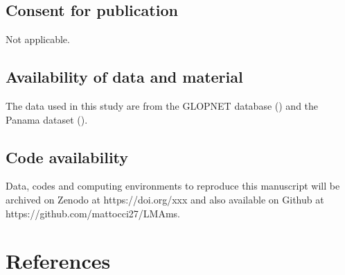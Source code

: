 \documentclass[
  12pt,
  letterpaper,
  DIV=11,
  numbers=noendperiod]{scrartcl}
\begin{document}
\subsection{Consent for publication}\label{consent-for-publication}

Not applicable.

\subsection{Availability of data and
material}\label{availability-of-data-and-material}

The data used in this study are from the GLOPNET database
() and the Panama dataset
().

\subsection{Code availability}\label{code-availability}

Data, codes and computing environments to reproduce this manuscript will
be archived on Zenodo at https://doi.org/xxx and also available on
Github at https://github.com/mattocci27/LMAms.

\section{References}\label{references}
\end{document}
